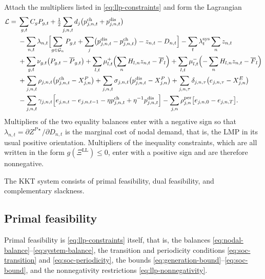 \documentclass[11pt,a4paper,fleqn]{article}
\numberwithin{equation}{section}
\begin{document}
Attach the multipliers listed in \eqref{eq:llp-constraints} and form the
Lagrangian
\begin{equation}\label{eq:lagrangian}
\begin{aligned}
\mathcal L
={}&
\sum_{g,t}C_gP_{g,t}
+\tfrac{1}{2}\sum_{j,n,t}d_j
\bigl(p^{\mathrm{ch}}_{j,n,t}+p^{\mathrm{dis}}_{j,n,t}\bigr)\\
&-\sum_{n,t}\lambda_{n,t}
\Bigl[
\sum_{g\in\mathcal G_n}P_{g,t}
+\sum_j\bigl(p^{\mathrm{dis}}_{j,n,t}-p^{\mathrm{ch}}_{j,n,t}\bigr)
-z_{n,t}-D_{n,t}
\Bigr]
-\sum_t\lambda^{\mathrm{sys}}_t\sum_n z_{n,t}\\
&+\sum_{g,t}\nu_{g,t}
\bigl(P_{g,t}-\overline P_{g,t}\bigr)
+\sum_{l,t}\mu^+_{l,t}
\Bigl(\sum_n H_{l,n}z_{n,t}-\overline F_l\Bigr)
+\sum_{l,t}\mu^-_{l,t}
\Bigl(-\sum_n H_{l,n}z_{n,t}-\overline F_l\Bigr)\\
&+\sum_{j,n,t}\rho_{j,n,t}
\bigl(p^{\mathrm{ch}}_{j,n,t}-X^P_{j,n}\bigr)
+\sum_{j,n,t}\sigma_{j,n,t}
\bigl(p^{\mathrm{dis}}_{j,n,t}-X^P_{j,n}\bigr)
+\sum_{j,n,\tau}\delta_{j,n,\tau}
\bigl(e_{j,n,\tau}-X^E_{j,n}\bigr)\\
&-\sum_{j,n,t}\gamma_{j,n,t}
\Bigl[
e_{j,n,t}-e_{j,n,t-1}
-\eta p^{\mathrm{ch}}_{j,n,t}
+\eta^{-1}p^{\mathrm{dis}}_{j,n,t}
\Bigr]
-\sum_{j,n}\rho^{\mathrm{per}}_{j,n}
\bigl[e_{j,n,0}-e_{j,n,T}\bigr].
\end{aligned}
\end{equation}
Multipliers of the two equality balances enter with a negative sign so that
$\lambda_{n,t}=\partial Z^{P\star}/\partial D_{n,t}$ is the marginal cost of
nodal demand, that is, the LMP in its usual positive orientation. Multipliers
of the inequality constraints, which are all written in the form
$g(\Xi^{\mathrm{LL}})\leq 0$, enter with a positive sign and are therefore
nonnegative.

The KKT system consists of primal feasibility, dual feasibility, and
complementary slackness.

\subsection{Primal feasibility}

Primal feasibility is \eqref{eq:llp-constraints} itself, that is, the
balances \eqref{eq:nodal-balance}--\eqref{eq:system-balance}, the transition
and periodicity conditions
\eqref{eq:soc-transition} and \eqref{eq:soc-periodicity}, the bounds
\eqref{eq:generation-bound}--\eqref{eq:soc-bound}, and the nonnegativity
restrictions \eqref{eq:llp-nonnegativity}.
\end{document}

